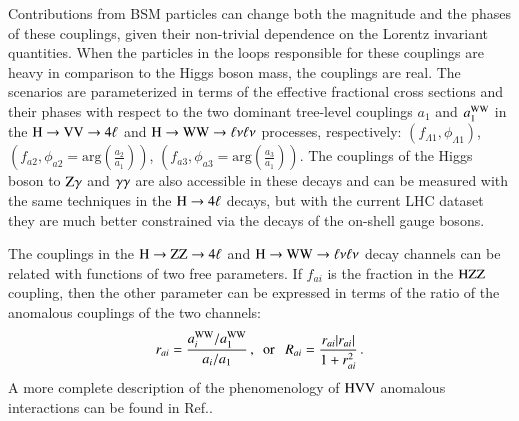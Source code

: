 Contributions from BSM particles can change both the magnitude and the
phases of these couplings, given their non-trivial dependence on the
Lorentz invariant quantities. When the particles in the loops
responsible for these couplings are heavy in comparison to the Higgs
boson mass, the couplings are real.  The scenarios are parameterized
in terms of the effective fractional cross sections and their phases
with respect to the two dominant tree-level couplings $a_1$ and
$a_1^{\mathrm{W}\mathrm{W}}$ in the $\mathrm{H}\to \mathrm{V}\mathrm{V}\to 4\ell$ and $\mathrm{H}\to \mathrm{W}\mathrm{W}\to
\ell\nu\ell\nu$ processes, respectively:
$(f_{\Lambda1},\phi_{\Lambda1})$, $(f_{a2}, \phi_{a2} =
\mathrm{arg}\left(\frac{a_{2}}{a_{1}}\right))$, $(f_{a3},\phi_{a3} =
\mathrm{arg}\left(\frac{a_{3}}{a_{1}}\right))$.  The couplings of the
Higgs boson to $\mathrm{Z}\gamma$ and $\gamma\gamma$ are also accessible in these
decays and can be measured with the same techniques in the
$\mathrm{H}\to4\ell$ decays, but with the current LHC dataset they are much
better constrained via the decays of the on-shell gauge bosons.

The couplings in the $\mathrm{H}\to\mathrm{Z}\mathrm{Z}\to4\ell$ and $\mathrm{H}\to\mathrm{W}\mathrm{W}\to\ell\nu\ell\nu$ decay channels can be
related with functions of two free parameters. If $f_{ai}$ is the
fraction in the $\mathrm{H}\mathrm{Z}\mathrm{Z}$ coupling, then the other parameter can be
expressed in terms of the ratio of the anomalous couplings of the two
channels:
%
\begin{eqnarray}
r_{ai} = \frac{a_i^{\mathrm{W}\mathrm{W}} / a_1^{\mathrm{W}\mathrm{W}}  }{  a_i / a_1}\,, ~~{\rm or}~~~ R_{ai} = \frac{ r_{ai} |r_{ai}| }{  1 + r_{ai}^2 }  \, .
\label{eq:ratio_ww_zz}
\end{eqnarray} 
%
%
A more complete description of the phenomenology of $\mathrm{H}\mathrm{V}\mathrm{V}$
anomalous interactions can be found in Ref.\cite{CMS:2014gga}.



